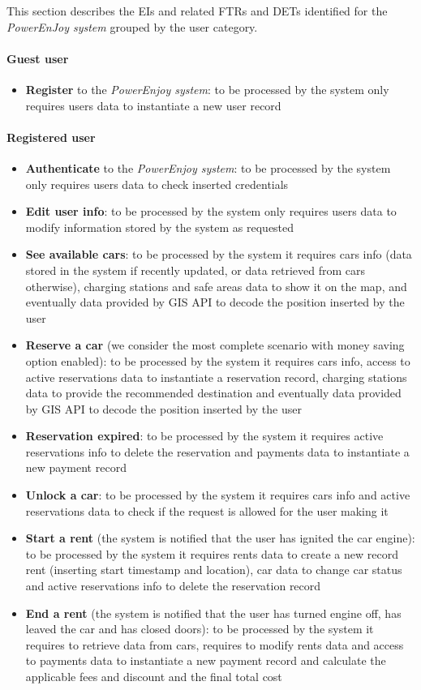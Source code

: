 This section describes the EIs and related FTRs and DETs identified for the \emph{PowerEnJoy system} grouped by the user category.

\paragraph{Guest user}
\begin{itemize}
	\item \textbf{Register} to the \emph{PowerEnjoy system}: to be processed by the system only requires users data to instantiate a new user record
\end{itemize}

\paragraph{Registered user}
\begin{itemize}
	\item \textbf{Authenticate} to the \emph{PowerEnjoy system}: to be processed by the system only requires users data to check inserted credentials
	\item \textbf{Edit user info}: to be processed by the system only requires users data to modify information stored by the system as requested
	\item \textbf{See available cars}: to be processed by the system it requires cars info (data stored in the system if recently updated, or data retrieved from cars otherwise), charging stations and safe areas data to show it on the map, and eventually data provided by GIS API to decode the position inserted by the user
	\item \textbf{Reserve a car} (we consider the most complete scenario with money saving option enabled): to be processed by the system it requires cars info, access to active reservations data to instantiate a reservation record, charging stations data to provide the recommended destination and eventually data provided by GIS API to decode the position inserted by the user
	\item \textbf{Reservation expired}: to be processed by the system it requires active reservations info to delete the reservation and payments data to instantiate a new payment record
	\item \textbf{Unlock a car}: to be processed by the system it requires cars info and active reservations data to check if the request is allowed for the user making it
	\item \textbf{Start a rent} (the system is notified that the user has ignited the car engine): to be processed by the system it requires rents data to create a new record rent (inserting start timestamp and location), car data to change car status and active reservations info to delete the reservation record
	\item \textbf{End a rent} (the system is notified that the user has turned engine off, has leaved the car and has closed doors): to be processed by the system it requires to retrieve data from cars, requires to modify rents data and access to payments data to instantiate a new payment record and calculate the applicable fees and discount and the final total cost
\end{itemize}

